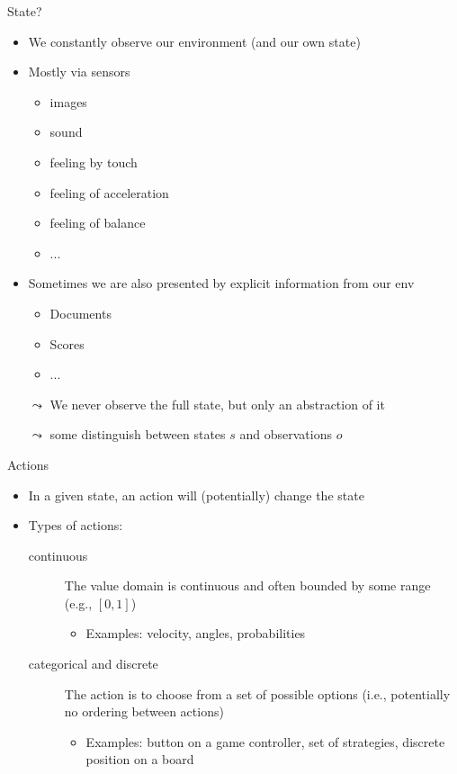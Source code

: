 \begin{frame}[c]{State?}
	
	\begin{itemize}
		\item We constantly observe our environment (and our own state)
		\item Mostly via sensors
		\begin{itemize}
			\item images
			\item sound
			\item feeling by touch
			\item feeling of acceleration
			\item feeling of balance
			\item ...
		\end{itemize}
		\pause
		\smallskip
		\item Sometimes we are also presented by explicit information from our env
		\begin{itemize}
			\item Documents
			\item Scores
			\item ...
		\end{itemize}
		\pause
		\smallskip
		\item[$\leadsto$] We never observe the full state, but only an abstraction of it
		\item[$\leadsto$] some distinguish between states $s$ and observations $o$
	\end{itemize}
	
	
\end{frame}
\begin{frame}[c]{Actions}
	
	\begin{itemize}
		\item In a given state, an action will (potentially) change the state 
		\medskip
		\pause
		\item Types of actions:
		\begin{description}
			\item[continuous] The value domain is continuous and often bounded by some range (e.g., $[0,1]$)
			\begin{itemize}
				\item Examples: velocity, angles, probabilities
			\end{itemize}
			\pause
			\item[categorical and discrete] The action is to choose from a set of possible options (i.e., potentially no ordering between actions)
			\begin{itemize}
				\item Examples: button on a game controller, set of strategies, discrete position on a board
			\end{itemize}
		\end{description}
	\end{itemize}
	
\end{frame}

